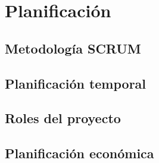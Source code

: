 
\chapter{Planificación}\label{planificacion}
\section{Metodología SCRUM}\label{sec:metodologia_scrum}

\section{Planificación temporal}\label{sec:planificacion_temporal}

\section{Roles del proyecto}\label{sec:roles_proyecto}

\section{Planificación económica}\label{sec:planificacion_economica}